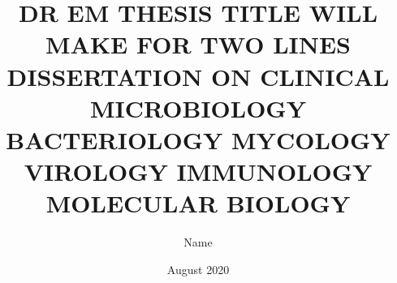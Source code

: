 
\title{DR EM THESIS TITLE WILL MAKE FOR TWO LINES DISSERTATION ON CLINICAL MICROBIOLOGY BACTERIOLOGY MYCOLOGY VIROLOGY IMMUNOLOGY MOLECULAR BIOLOGY}

\author{Name}

\date{August 2020}

\maketitle

